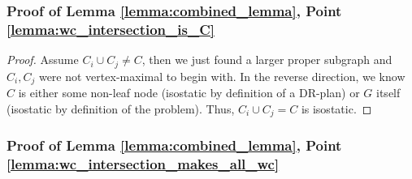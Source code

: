 







\subsubsection{Proof of Lemma \ref{lemma:combined_lemma}, Point \ref{lemma:wc_intersection_is_C}}

\begin{proof}
Assume $C_i\cup C_j \neq C$, then we just found a larger proper subgraph and $C_i,C_j$ were not vertex-maximal to begin with.
%
In the reverse direction, we know $C$ is either some non-leaf node (isostatic by definition of a DR-plan) or $G$ itself (isostatic by definition of the problem). Thus, $C_i\cup C_j=C$ is isostatic.
\end{proof}


\subsubsection{Proof of Lemma \ref{lemma:combined_lemma}, Point \ref{lemma:wc_intersection_makes_all_wc}}

